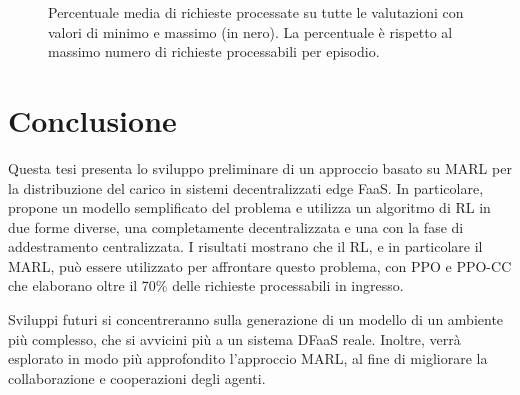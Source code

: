 \documentclass[a4paper, twocolumn]{article}
\begin{document}
\begin{figure}
    \caption{Percentuale media di richieste processate su tutte le valutazioni con valori di minimo e massimo (in nero). La percentuale è rispetto al massimo numero di richieste processabili per episodio.}
    \label{fig:results_requests}
\end{figure}

\section{Conclusione}

Questa tesi presenta lo sviluppo preliminare di un approccio basato su MARL per la distribuzione del carico in sistemi decentralizzati edge FaaS. In particolare, propone un modello semplificato del problema e utilizza un algoritmo di RL in due forme diverse, una completamente decentralizzata e una con la fase di addestramento centralizzata. I risultati mostrano che il RL, e in particolare il MARL, può essere utilizzato per affrontare questo problema, con PPO e PPO-CC che elaborano oltre il 70\% delle richieste processabili in ingresso.

Sviluppi futuri si concentreranno sulla generazione di un modello di un ambiente più complesso, che si avvicini più a un sistema DFaaS reale. Inoltre, verrà esplorato in modo più approfondito l'approccio MARL, al fine di migliorare la collaborazione e cooperazioni degli agenti.

\printbibliography[title=Riferimenti bibliografici]
\end{document}
